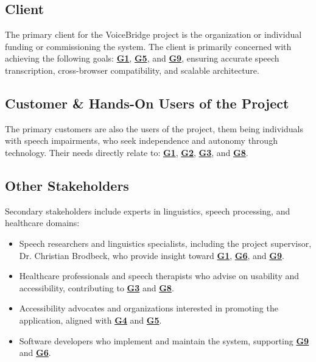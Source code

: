 \documentclass[11pt]{article}
\begin{document}
\subsection{Client}
The primary client for the VoiceBridge project is the organization or individual funding or commissioning the system. The client is primarily concerned with achieving the following goals: \textbf{\hyperref[tab:project-goals]{G1}}, \textbf{\hyperref[tab:project-goals]{G5}}, and \textbf{\hyperref[tab:project-goals]{G9}}, ensuring accurate speech transcription, cross-browser compatibility, and scalable architecture.

\subsection{Customer \& Hands-On Users of the Project}

The primary customers are also the users of the project, them being individuals with speech impairments, who seek independence and autonomy through technology. Their needs directly relate to: \textbf{\hyperref[tab:project-goals]{G1}}, \textbf{\hyperref[tab:project-goals]{G2}}, \textbf{\hyperref[tab:project-goals]{G3}}, and \textbf{\hyperref[tab:project-goals]{G8}}.

\subsection{Other Stakeholders}
Secondary stakeholders include experts in linguistics, speech processing, and healthcare domains:
\begin{itemize}
    \item Speech researchers and linguistics specialists, including the project supervisor, Dr. Christian Brodbeck, who provide insight toward \textbf{\hyperref[tab:project-goals]{G1}}, \textbf{\hyperref[tab:project-goals]{G6}}, and \textbf{\hyperref[tab:project-goals]{G9}}.
    \item Healthcare professionals and speech therapists who advise on usability and accessibility, contributing to \textbf{\hyperref[tab:project-goals]{G3}} and \textbf{\hyperref[tab:project-goals]{G8}}.
    \item Accessibility advocates and organizations interested in promoting the application, aligned with \textbf{\hyperref[tab:project-goals]{G4}} and \textbf{\hyperref[tab:project-goals]{G5}}.
    \item Software developers who implement and maintain the system, supporting \textbf{\hyperref[tab:project-goals]{G9}} and \textbf{\hyperref[tab:project-goals]{G6}}.
\end{itemize}
\end{document}
